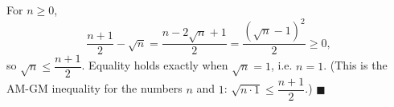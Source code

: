 For $n\ge0$,
\[\dfrac{n+1}{2}-\sqrt n=\dfrac{n-2\sqrt n+1}{2}=\dfrac{\left(\sqrt n-1\right)^2}{2}\ge0,\]
so $\sqrt n\le\dfrac{n+1}{2}$. Equality holds exactly when $\sqrt n=1$, i.e. $\boxed{n=1}$. (This is the AM-GM inequality for the numbers $n$ and $1$: $\sqrt{n\cdot1}\le\dfrac{n+1}{2}$.) $\blacksquare$
